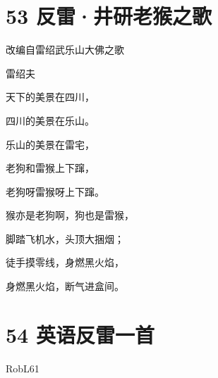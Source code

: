 \documentclass[UTF8,12pt,oneside]{ctexbook}
\begin{document}
        \section{53 反雷·井研老猴之歌}
        \begin{center}
            \Large \kaishu
            改编自雷绍武乐山大佛之歌
            \songti \large
            
            雷绍夫
        \end{center}
        
        \begin{center}
            天下的美景在四川，
            
            四川的美景在乐山。
            
            乐山的美景在雷宅，
            
            老狗和雷猴上下蹿，
            
            老狗呀雷猴呀上下蹿。
            
            猴亦是老狗啊，狗也是雷猴，
            
            脚踏飞机水，头顶大捆烟；
            
            徒手摸零线，身燃黑火焰，
            
            身燃黑火焰，断气进盒间。
        \end{center}
        
        \section{54 英语反雷一首}
        \begin{center}
            RobL61
        \end{center}
        
\end{document}
